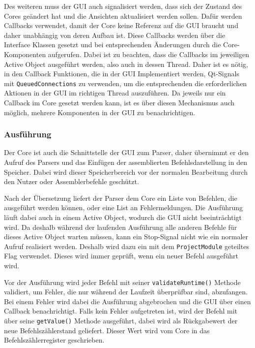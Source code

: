 Des weiteren muss der GUI auch signalisiert werden, dass sich der Zustand des
Cores geändert hat und die Ansichten aktualisiert werden sollen. Dafür werden
Callbacks verwendet, damit der Core keine Referenz auf die GUI braucht und daher
unabhängig von deren Aufbau ist. Diese Callbacks werden über die Interface
Klassen gesetzt und bei entsprechenden Änderungen durch die Core-Komponenten
aufgerufen. Dabei ist zu beachten, dass die Callbacks im jeweiligen Active
Object ausgeführt werden, also auch in dessen Thread. Daher ist es nötig, in den
Callback Funktionen, die in der GUI Implementiert werden, Qt-Signals mit
\texttt{QueuedConnections} zu verwenden, um die entsprechenden die
erforderlichen Aktionen in der GUI im richtigen Thread auszuführen. Da jeweils
nur ein Callback im Core gesetzt werden kann, ist es über diesen Mechanismus
auch möglich, mehrere Komponenten in der GUI zu benachrichtigen.

\subsubsection{Ausführung}

Der Core ist auch die Schnittstelle der GUI zum Parser, daher übernimmt er den
Aufruf des Parsers und das Einfügen der assemblierten Befehlsdarstellung in den
Speicher. Dabei wird dieser Speicherbereich vor der normalen Bearbeitung durch
den Nutzer oder Assemblerbefehle geschützt.

Nach der Übersetzung liefert der Parser dem Core ein Liste von Befehlen, die
ausgeführt werden können, oder eine List an Fehlermeldungen. Die Ausführung
läuft dabei auch in einem Active Object, wodurch die GUI nicht beeinträchtigt
wird. Da deshalb während der laufenden Ausführung alle anderen Befehle für
dieses Active Object warten müssen, kann ein Stop-Signal nicht wie ein normaler
Aufruf realisiert werden. Deshalb wird dazu ein mit dem \texttt{ProjectModule}
geteiltes Flag verwendet. Dieses wird immer geprüft, wenn ein neuer Befehl
ausgeführt wird.

Vor der Ausführung wird jeder Befehl mit seiner \texttt{validateRuntime()}
Methode validiert, um Fehler, die nur während der Laufzeit überprüfbar sind,
abzufangen. Bei einem Fehler wird dabei die Ausführung abgebrochen und die GUI
über einen Callback benachrichtigt. Falls kein Fehler aufgetreten ist, wird der
Befehl mit über seine \texttt{getValue()} Methode ausgeführt, dabei wird als
Rückgabewert der neue Befehlszählerstand geliefert. Dieser Wert wird vom Core in
das Befehlszählerregister geschrieben.

